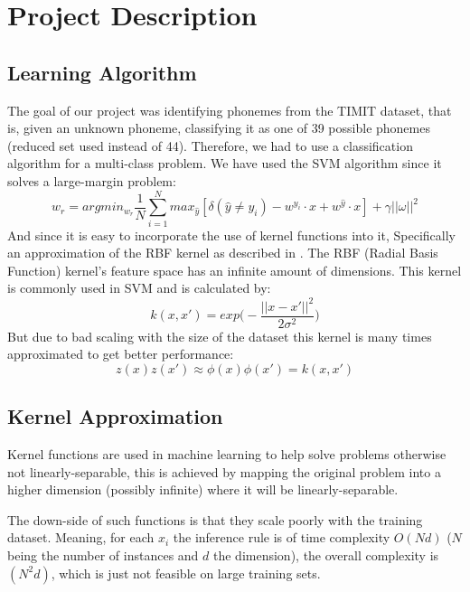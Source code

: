 \documentclass[12pt,a4paper]{article}
\begin{document}
\section{Project Description}
\subsection{Learning Algorithm}
The goal of our project was identifying phonemes from the TIMIT dataset, that is, given an unknown phoneme, classifying it as one of 39 possible phonemes (reduced set used instead of 44). Therefore, we had to use a classification algorithm for a multi-class problem. We have used the SVM algorithm since it solves a large-margin problem:
\begin{equation}
{w_r} = argmin_{w_r}\frac{1}{N}\sum_{i=1}^{N}max_{\widehat{y}}[\delta(\widehat{y} \neq y_i) - w^{y_i} \cdot x + w^{\widehat{y}} \cdot x]+\gamma ||\omega||^2
\end{equation}
And since it is easy to incorporate the use of kernel functions into it, Specifically an approximation of the RBF kernel as described in \cite{Rahimi07randomfeatures}. 
The RBF (Radial Basis Function) kernel's feature space has an infinite amount of dimensions. This kernel is commonly used in SVM and is calculated by:
\begin{equation}
k(x,x') = exp\bigg( -\frac{||x - x'||^2}{2\sigma^2} \bigg)
\end{equation}
But due to bad scaling with the size of the dataset this kernel is many times approximated to get better performance:
\begin{equation}
z(x)z(x') \approx \phi(x)\phi(x') = k(x,x')
\end{equation}


\subsection{Kernel Approximation}
Kernel functions are used in machine learning to help solve problems otherwise not linearly-separable, this is achieved by mapping the original problem into a higher dimension (possibly infinite) where it will be linearly-separable. 

The down-side of such functions is that they scale poorly with the training dataset. Meaning, for each $x_i$ the inference rule is of time complexity $O(Nd)$ ($N$ being the number of instances and $d$ the dimension), the overall complexity is $(N^2d)$, which is just not feasible on large training sets. 
\end{document}
